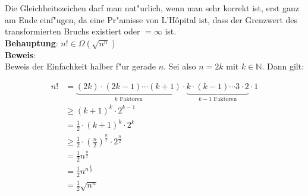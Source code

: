 \documentclass{scrartcl}
\begin{document}
Die Gleichheitszeichen darf man nat"urlich, wenn man sehr korrekt ist, erst ganz am Ende einf"ugen, da
eine Pr"amisse von L'H\^{o}pital ist, dass der Grenzwert des transformierten Bruchs existiert oder
$= \infty$ ist.
\\

\noindent\textbf{Behauptung}: $n! \in \Omega(\sqrt{n^n})$ \\
\textbf{Beweis}:   \\

Beweis der Einfachkeit halber f"ur gerade $n$. Sei also $n = 2k$ mit $k \in \mathbb{N}$. Dann gilt:

\begin{align*}
  n! &= \underbrace{(2k)\cdot(2k-1)\cdots(k+1)}_{k \text{ Faktoren}}\cdot \underbrace{k \cdot (k-1) \cdots 3 \cdot 2}_{k - 1 \text{ Faktoren}} \cdot 1  \\
  &\geq (k+1)^k \cdot 2^{k-1} \\
  &= \frac{1}{2} \cdot (k+1)^k \cdot 2^k \\
  &\geq \frac{1}{2} \cdot \left(\frac{n}{2}\right)^{\frac{n}{2}} \cdot 2^{\frac{n}{2}} \\
  &= \frac{1}{2} n^{\frac{n}{2}} \\
  &= \frac{1}{2} {n^n}^{\frac{1}{2}} \\
  &= \frac{1}{2} \sqrt{n^n}
\end{align*}
\end{document}
